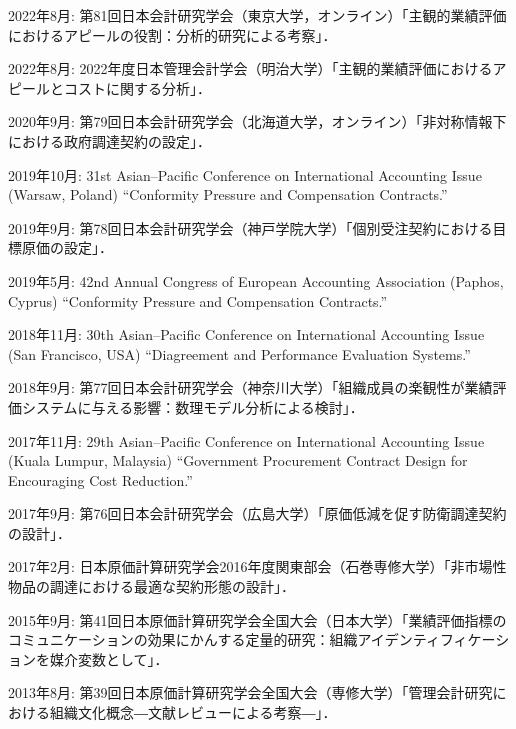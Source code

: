 \documentclass[letterpaper,uplatex]{article}
\renewenvironment{itemize}{
  \begin{list}{}{
    \setlength{\leftmargin}{1.5em}
  }
}{
  \end{list}
}
\begin{document}
\begin{itemize}
    \item 2022年8月: 第81回日本会計研究学会（東京大学，オンライン）「主観的業績評価におけるアピールの役割：分析的研究による考察」．
    
    \item 2022年8月: 2022年度日本管理会計学会（明治大学）「主観的業績評価におけるアピールとコストに関する分析」．

  \item 2020年9月: 第79回日本会計研究学会（北海道大学，オンライン）「非対称情報下における政府調達契約の設定」．
  
  \item 2019年10月: 31st Asian--Pacific Conference on International Accounting Issue (Warsaw, Poland) ``Conformity Pressure and Compensation Contracts.''

  \item 2019年9月: 第78回日本会計研究学会（神戸学院大学）「個別受注契約における目標原価の設定」．

  \item 2019年5月: 42nd Annual Congress of European Accounting Association (Paphos, Cyprus) ``Conformity Pressure and Compensation Contracts.''

  \item 2018年11月: 30th Asian--Pacific Conference on International Accounting Issue (San Francisco, USA) ``Diagreement and Performance Evaluation Systems.''

  \item 2018年9月: 第77回日本会計研究学会（神奈川大学）「組織成員の楽観性が業績評価システムに与える影響：数理モデル分析による検討」．

	\item 2017年11月: 29th Asian--Pacific Conference on International Accounting Issue (Kuala Lumpur, Malaysia) ``Government Procurement Contract Design for Encouraging Cost Reduction.''

	\item 2017年9月: 第76回日本会計研究学会（広島大学）「原価低減を促す防衛調達契約の設計」．

	\item 2017年2月: 日本原価計算研究学会2016年度関東部会（石巻専修大学）「非市場性物品の調達における最適な契約形態の設計」．

	\item 2015年9月: 第41回日本原価計算研究学会全国大会（日本大学）「業績評価指標のコミュニケーションの効果にかんする定量的研究：組織アイデンティフィケーションを媒介変数として」．

	\item 2013年8月: 第39回日本原価計算研究学会全国大会（専修大学）「管理会計研究における組織文化概念―文献レビューによる考察―」．
\end{itemize}
\end{document}
